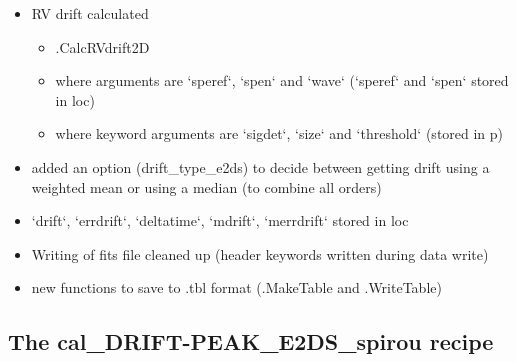 \begin{itemize}
\item RV drift calculated
	\begin{itemize}
	\item \spirouRV.CalcRVdrift2D
	\item where arguments are `speref`, `spen` and `wave` (`speref` and `spen` stored in loc)
	\item where keyword arguments are `sigdet`, `size` and `threshold` (stored in p)
	\end{itemize}

\item added an option (drift\_type\_e2ds) to decide between getting drift using a weighted mean or using a median (to combine all orders)

\item `drift`, `errdrift`, `deltatime`, `mdrift`, `merrdrift` stored in loc

\item Writing of fits file cleaned up (header keywords written during data write)

\item new functions to save to .tbl format (\spirouImage.MakeTable and \spirouImage.WriteTable)

\end{itemize}


\subsection{The cal\_DRIFT-PEAK\_E2DS\_spirou recipe}
\label{ch:changelog:At4:cal_DRIFT-PEAK_E2DS_spirou}

